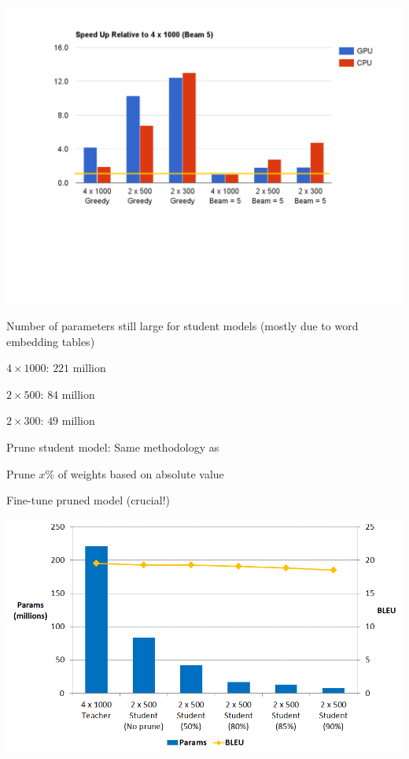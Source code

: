 \documentclass{beamer}
\let\tempone\itemize
\let\temptwo\enditemize
\renewenvironment{itemize}{\tempone\addtolength{\itemsep}{0.5\baselineskip}}{\temptwo}
\newcommand{\air}{\vspace{0.25cm}}
\begin{document}
\begin{frame}
\centerline{}
\center
\vspace{-5mm}
\includegraphics[scale=0.44]{dec-speed.pdf}
\end{frame}


\begin{frame}
\centerline{}
\air
\air
Number of parameters still large for student models (mostly due to word embedding tables)
\begin{itemize}
\item $4 \times 1000$: $221$ million
\item $2 \times 500$: $84$ million
\item $2 \times 300$: $49$ million
\end{itemize}
 \air

Prune student model: Same methodology as \cite{See2016}
\begin{itemize}
\item Prune $x\%$ of weights based on absolute value
\item Fine-tune pruned model (crucial!)
\end{itemize}
\end{frame}

\begin{frame}
\centerline{}
\air
\air
\includegraphics[scale=0.4]{size}
\end{frame}
\end{document}
